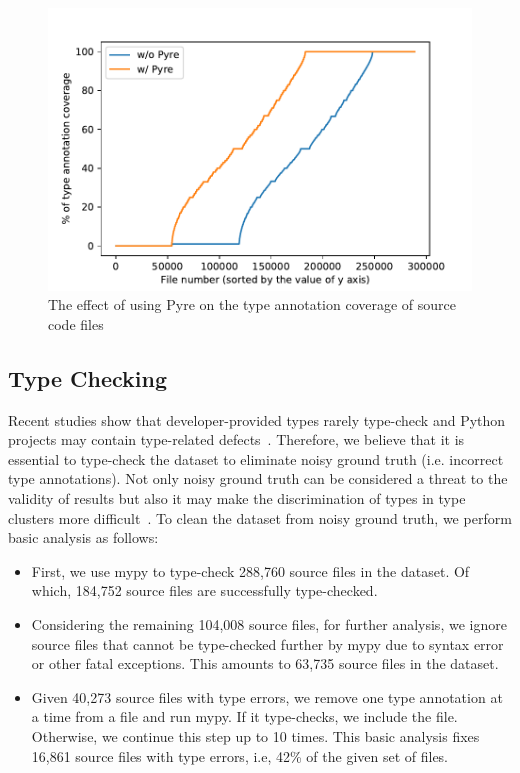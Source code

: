\begin{figure}[!t]
	\centering
	\includegraphics[width=\linewidth]{chapters/ch4/figs/type_cove_f_pyre.pdf}
	\caption{The effect of using Pyre on the type annotation coverage of source code files}
	\label{ch4:fig:dataset-type-annot-cove-pyre}
\end{figure}

\subsection{Type Checking}
Recent studies show that developer-provided types rarely type-check and Python projects may contain type-related defects~\cite{ore2018assessing, rak2020python, khan2021empirical}. Therefore, we believe that it is essential to type-check the dataset to eliminate noisy ground truth (i.e. incorrect type annotations). Not only noisy ground truth can be considered a threat to the validity of results but also it may make the discrimination of types in type clusters more difficult~\cite{garcia2015effect}. To clean the dataset from noisy ground truth, we perform basic analysis as follows:
\begin{itemize}
	\item First, we use mypy to type-check 288,760 source files in the dataset. Of which, 184,752 source files are successfully type-checked.
	\item Considering the remaining 104,008 source files, for further analysis, we ignore source files that cannot be type-checked further by mypy due to syntax error or other fatal exceptions. This amounts to 63,735 source files in the dataset.
	\item Given 40,273 source files with type errors, we remove one type annotation at a time from a file and run mypy. If it type-checks, we include the file. Otherwise, we continue this step up to 10 times. This basic analysis fixes 16,861 source files with type errors, i.e, 42\% of the given set of files.
\end{itemize}

